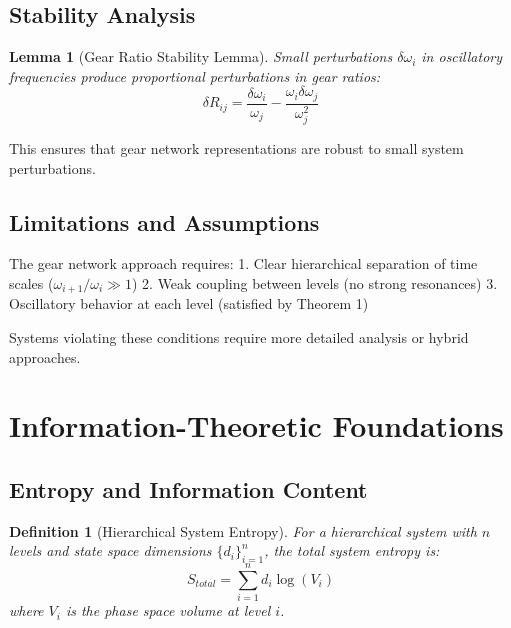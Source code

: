 \documentclass[11pt]{article}
\newtheorem{lemma}[theorem]{Lemma}
\newtheorem{definition}[theorem]{Definition}
\theoremstyle{remark}
\begin{document}
\subsection{Stability Analysis}

\begin{lemma}[Gear Ratio Stability Lemma]
Small perturbations $\delta\omega_i$ in oscillatory frequencies produce proportional perturbations in gear ratios:
\begin{equation}
\delta R_{ij} = \frac{\delta\omega_i}{\omega_j} - \frac{\omega_i \delta\omega_j}{\omega_j^2}
\label{eq:gear_ratio_perturbation}
\end{equation}
\end{lemma}

This ensures that gear network representations are robust to small system perturbations.

\subsection{Limitations and Assumptions}

The gear network approach requires:
1. Clear hierarchical separation of time scales ($\omega_{i+1}/\omega_i \gg 1$)
2. Weak coupling between levels (no strong resonances)
3. Oscillatory behavior at each level (satisfied by Theorem 1)

Systems violating these conditions require more detailed analysis or hybrid approaches.

\section{Information-Theoretic Foundations}

\subsection{Entropy and Information Content}

\begin{definition}[Hierarchical System Entropy]
For a hierarchical system with $n$ levels and state space dimensions $\{d_i\}_{i=1}^{n}$, the total system entropy is:
\begin{equation}
S_{total} = \sum_{i=1}^{n} d_i \log(V_i)
\label{eq:total_entropy}
\end{equation}
where $V_i$ is the phase space volume at level $i$.
\end{definition}
\end{document}
